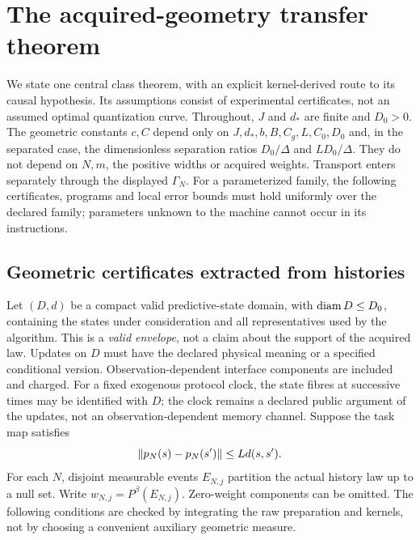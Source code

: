 \section{The acquired-geometry transfer theorem}\label{sec:main}
We state one central class theorem, with an explicit kernel-derived route to its causal hypothesis. Its assumptions consist of experimental certificates, not an assumed optimal quantization curve. Throughout, $J$ and $d_*$ are finite and $D_0>0$. The geometric constants $c,C$ depend only on $J,d_*,b,B,C_g,L,C_0,D_0$ and, in the separated case, the dimensionless separation ratios $D_0/\Delta$ and $LD_0/\Delta$. They do not depend on $N,m$, the positive widths or acquired weights. Transport enters separately through the displayed $\Gamma_N$. For a parameterized family, the following certificates, programs and local error bounds must hold uniformly over the declared family; parameters unknown to the machine cannot occur in its instructions.

\subsection{Geometric certificates extracted from histories}
Let $(D,d)$ be a compact valid predictive-state domain, with $\operatorname{diam} D\le D_0$, containing the states under consideration and all representatives used by the algorithm. This is a \emph{valid envelope}, not a claim about the support of the acquired law. Updates on $D$ must have the declared physical meaning or a specified conditional version. Observation-dependent interface components are included and charged. For a fixed exogenous protocol clock, the state fibres at successive times may be identified with $D$; the clock remains a declared public argument of the updates, not an observation-dependent memory channel. Suppose the task map satisfies
\begin{equation}\label{eq:task-lip}
 \lVert p_N(s)-p_N(s')\rVert\le Ld(s,s').
\end{equation}
For each $N$, disjoint measurable events $E_{N,j}$ partition the actual history law up to a null set. Write $w_{N,j}=P^\beta(E_{N,j})$. Zero-weight components can be omitted. The following conditions are checked by integrating the raw preparation and kernels, not by choosing a convenient auxiliary geometric measure.

